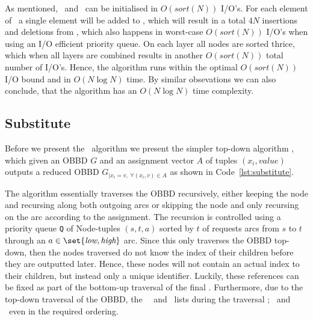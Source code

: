 \clearpage
As mentioned, \ReduceLwork\ and \ReduceLdep\ can be initialised in $O(sort(N))$
I/O's. For each element of \ReduceLdep\ a single element will be added to
\ReduceQdep, which will result in a total $4 N$ insertions and deletions from
\ReduceQdep, which also happens in worst-case $O(sort(N))$ I/O's when using an
I/O efficient priority queue. On each layer all nodes are sorted thrice, which
when all layers are combined results in another $O(sort(N))$ total number of I/O's.
Hence, the algorithm runs within the optimal $O(sort(N))$ I/O bound and in $O(N
\log N)$ time. \cite{Arge96} By similar obsevations we can also conclude, that
the algorithm has an $O(N \log N)$ time complexity.

\subsection{Substitute} \label{sec:theory_substitute}
Before we present the \Apply\ algorithm we present the simpler top-down
algorithm \Substitute, which given an OBBD $G$ and an assignment vector $A$ of
tuples $(x_i, \mathit{value})$ outputs a reduced OBBD $G_{| x_i = v ,\ \forall
  (x_i,v) \in A}$ as shown in Code~\ref{lst:substitute}.

The algorithm essentially traverses the OBBD recursively, either keeping the
node and recursing along both outgoing arcs or skipping the node and only
recursing on the arc according to the assignment. The recursion is controlled
using a priority queue \lstinline{Q} of Node-tuples $(s,t,a)$ sorted by $t$ of
requests arcs from $s$ to $t$ through an $a \in \set{\textit{low},
  \textit{high}}$ arc. Since this only traverses the OBBD top-down, then the
nodes traversed do not know the index of their children before they are
outputted later. Hence, these nodes will not contain an actual index to their
children, but instead only a unique identifier. Luckily, these references can be
fixed as part of the bottom-up traversal of the final \Reduce. Furthermore, due
to the top-down traversal of the OBBD, the \ReduceL\, \ReduceLnode\ and
\ReduceLsink\ lists during the traversal \Reduce; \ReduceL\ and \ReduceLnode\
even in the required ordering.


